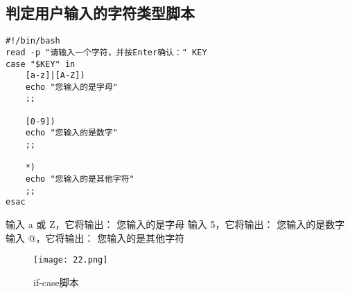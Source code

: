 \documentclass[a4paper, 12pt]{article}
\begin{document}
\subsection{判定用户输入的字符类型脚本}  
\begin{lstlisting}
#!/bin/bash
read -p "请输入一个字符，并按Enter确认：" KEY
case "$KEY" in
	[a-z]|[A-Z])
	echo "您输入的是字母"
	;;
	
	[0-9])
	echo "您输入的是数字"
	;;
	
	*)
	echo "您输入的是其他字符"
	;;
esac
\end{lstlisting}
输入 a 或 Z，它将输出：
您输入的是字母
输入 5，它将输出：
您输入的是数字
输入 @，它将输出：
您输入的是其他字符
\begin{figure}[H]
  \centering
    \texttt{[image: 22.png]}
  \caption{if-case脚本}
   \end{figure}
\end{document}
